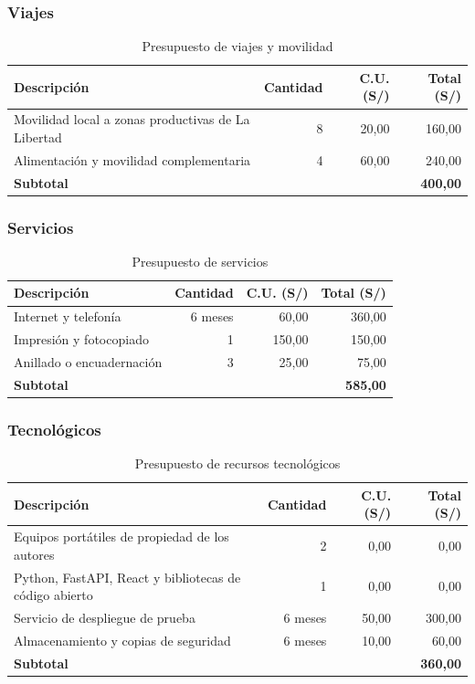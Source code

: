 \subsubsection{Viajes}

\begin{table}[H]
\centering
\caption{Presupuesto de viajes y movilidad}
\small
\begin{tabularx}{\textwidth}{Xrrr}
\toprule
\textbf{Descripción} & \textbf{Cantidad} & \textbf{C.U. (S/)} & \textbf{Total (S/)} \\
\midrule
Movilidad local a zonas productivas de La Libertad & 8 & 20,00 & 160,00 \\
Alimentación y movilidad complementaria & 4 & 60,00 & 240,00 \\
\midrule
\textbf{Subtotal} & & & \textbf{400,00} \\
\bottomrule
\end{tabularx}
\end{table}

\subsubsection{Servicios}

\begin{table}[H]
\centering
\caption{Presupuesto de servicios}
\small
\begin{tabularx}{\textwidth}{Xrrr}
\toprule
\textbf{Descripción} & \textbf{Cantidad} & \textbf{C.U. (S/)} & \textbf{Total (S/)} \\
\midrule
Internet y telefonía & 6 meses & 60,00 & 360,00 \\
Impresión y fotocopiado & 1 & 150,00 & 150,00 \\
Anillado o encuadernación & 3 & 25,00 & 75,00 \\
\midrule
\textbf{Subtotal} & & & \textbf{585,00} \\
\bottomrule
\end{tabularx}
\end{table}

\subsubsection{Tecnológicos}

\begin{table}[H]
\centering
\caption{Presupuesto de recursos tecnológicos}
\small
\begin{tabularx}{\textwidth}{Xrrr}
\toprule
\textbf{Descripción} & \textbf{Cantidad} & \textbf{C.U. (S/)} & \textbf{Total (S/)} \\
\midrule
Equipos portátiles de propiedad de los autores & 2 & 0,00 & 0,00 \\
Python, FastAPI, React y bibliotecas de código abierto & 1 & 0,00 & 0,00 \\
Servicio de despliegue de prueba & 6 meses & 50,00 & 300,00 \\
Almacenamiento y copias de seguridad & 6 meses & 10,00 & 60,00 \\
\midrule
\textbf{Subtotal} & & & \textbf{360,00} \\
\bottomrule
\end{tabularx}
\end{table}

